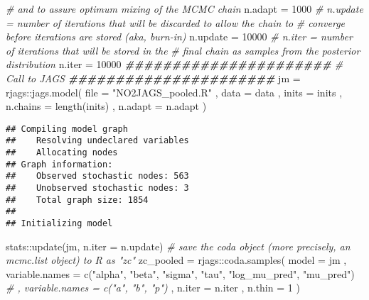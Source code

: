 \documentclass[
]{article}
\newenvironment{Shaded}{\begin{snugshade}}{\end{snugshade}}
\newcommand{\AttributeTok}[1]{\textcolor[rgb]{0.77,0.63,0.00}{#1}}
\newcommand{\CommentTok}[1]{\textcolor[rgb]{0.56,0.35,0.01}{\textit{#1}}}
\newcommand{\DecValTok}[1]{\textcolor[rgb]{0.00,0.00,0.81}{#1}}
\newcommand{\DocumentationTok}[1]{\textcolor[rgb]{0.56,0.35,0.01}{\textbf{\textit{#1}}}}
\newcommand{\FunctionTok}[1]{\textcolor[rgb]{0.00,0.00,0.00}{#1}}
\newcommand{\NormalTok}[1]{#1}
\newcommand{\OtherTok}[1]{\textcolor[rgb]{0.56,0.35,0.01}{#1}}
\newcommand{\SpecialCharTok}[1]{\textcolor[rgb]{0.00,0.00,0.00}{#1}}
\newcommand{\StringTok}[1]{\textcolor[rgb]{0.31,0.60,0.02}{#1}}
\begin{document}
\begin{Shaded}
\begin{Highlighting}[]
  \CommentTok{\# and to assure optimum mixing of the MCMC chain}
\NormalTok{n.adapt }\OtherTok{=} \DecValTok{1000}
\CommentTok{\# n.update = number of iterations that will be discarded to allow the chain to }
\CommentTok{\#   converge before iterations are stored (aka, burn{-}in)}
\NormalTok{n.update }\OtherTok{=} \DecValTok{10000}
\CommentTok{\# n.iter = number of iterations that will be stored in the }
  \CommentTok{\# final chain as samples from the posterior distribution}
\NormalTok{n.iter }\OtherTok{=} \DecValTok{10000}
\DocumentationTok{\#\#\#\#\#\#\#\#\#\#\#\#\#\#\#\#\#\#\#\#\#\#}
\CommentTok{\# Call to JAGS}
\DocumentationTok{\#\#\#\#\#\#\#\#\#\#\#\#\#\#\#\#\#\#\#\#\#\#}
\NormalTok{jm }\OtherTok{=}\NormalTok{ rjags}\SpecialCharTok{::}\FunctionTok{jags.model}\NormalTok{(}
  \AttributeTok{file =} \StringTok{"NO2JAGS\_pooled.R"}
\NormalTok{  , }\AttributeTok{data =}\NormalTok{ data}
\NormalTok{  , }\AttributeTok{inits =}\NormalTok{ inits}
\NormalTok{  , }\AttributeTok{n.chains =} \FunctionTok{length}\NormalTok{(inits)}
\NormalTok{  , }\AttributeTok{n.adapt =}\NormalTok{ n.adapt}
\NormalTok{)}
\end{Highlighting}
\end{Shaded}

\begin{verbatim}
## Compiling model graph
##    Resolving undeclared variables
##    Allocating nodes
## Graph information:
##    Observed stochastic nodes: 563
##    Unobserved stochastic nodes: 3
##    Total graph size: 1854
## 
## Initializing model
\end{verbatim}

\begin{Shaded}
\begin{Highlighting}[]
\NormalTok{stats}\SpecialCharTok{::}\FunctionTok{update}\NormalTok{(jm, }\AttributeTok{n.iter =}\NormalTok{ n.update)}
\CommentTok{\# save the coda object (more precisely, an mcmc.list object) to R as "zc"}
\NormalTok{zc\_pooled }\OtherTok{=}\NormalTok{ rjags}\SpecialCharTok{::}\FunctionTok{coda.samples}\NormalTok{(}
  \AttributeTok{model =}\NormalTok{ jm}
\NormalTok{  , }\AttributeTok{variable.names =} \FunctionTok{c}\NormalTok{(}\StringTok{"alpha"}\NormalTok{, }\StringTok{"beta"}\NormalTok{, }\StringTok{"sigma"}\NormalTok{, }\StringTok{"tau"}\NormalTok{, }\StringTok{"log\_mu\_pred"}\NormalTok{, }\StringTok{"mu\_pred"}\NormalTok{)}
  \CommentTok{\# , variable.names = c("a", "b", "p")}
\NormalTok{  , }\AttributeTok{n.iter =}\NormalTok{ n.iter}
\NormalTok{  , }\AttributeTok{n.thin =} \DecValTok{1}
\NormalTok{)}
\end{Highlighting}
\end{Shaded}
\end{document}
